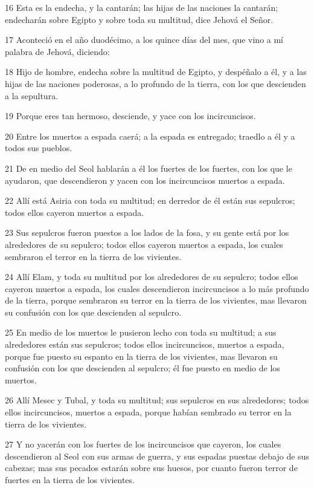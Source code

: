 \par 16 Esta es la endecha, y la cantarán; las hijas de las naciones la cantarán; endecharán sobre Egipto y sobre toda su multitud, dice Jehová el Señor.
\par 17 Aconteció en el año duodécimo, a los quince días del mes, que vino a mí palabra de Jehová, diciendo:
\par 18 Hijo de hombre, endecha sobre la multitud de Egipto, y despéñalo a él, y a las hijas de las naciones poderosas, a lo profundo de la tierra, con los que descienden a la sepultura.
\par 19 Porque eres tan hermoso, desciende, y yace con los incircuncisos.
\par 20 Entre los muertos a espada caerá; a la espada es entregado; traedlo a él y a todos sus pueblos.
\par 21 De en medio del Seol hablarán a él los fuertes de los fuertes, con los que le ayudaron, que descendieron y yacen con los incircuncisos muertos a espada.
\par 22 Allí está Asiria con toda su multitud; en derredor de él están sus sepulcros; todos ellos cayeron muertos a espada.
\par 23 Sus sepulcros fueron puestos a los lados de la fosa, y su gente está por los alrededores de su sepulcro; todos ellos cayeron muertos a espada, los cuales sembraron el terror en la tierra de los vivientes.
\par 24 Allí Elam, y toda su multitud por los alrededores de su sepulcro; todos ellos cayeron muertos a espada, los cuales descendieron incircuncisos a lo más profundo de la tierra, porque sembraron su terror en la tierra de los vivientes, mas llevaron su confusión con los que descienden al sepulcro.
\par 25 En medio de los muertos le pusieron lecho con toda su multitud; a sus alrededores están sus sepulcros; todos ellos incircuncisos, muertos a espada, porque fue puesto su espanto en la tierra de los vivientes, mas llevaron su confusión con los que descienden al sepulcro; él fue puesto en medio de los muertos.
\par 26 Allí Mesec y Tubal, y toda su multitud; sus sepulcros en sus alrededores; todos ellos incircuncisos, muertos a espada, porque habían sembrado su terror en la tierra de los vivientes.
\par 27 Y no yacerán con los fuertes de los incircuncisos que cayeron, los cuales descendieron al Seol con sus armas de guerra, y sus espadas puestas debajo de sus cabezas; mas sus pecados estarán sobre sus huesos, por cuanto fueron terror de fuertes en la tierra de los vivientes.
